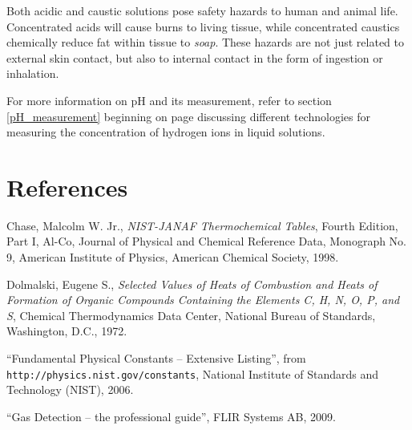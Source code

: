 \vskip 10pt

Both acidic and caustic solutions pose safety hazards to human and animal life.  Concentrated acids will cause burns to living tissue, while concentrated caustics chemically reduce fat within tissue to \textit{soap}.  These hazards are not just related to external skin contact, but also to internal contact in the form of ingestion or inhalation.

\vskip 10pt

For more information on pH and its measurement, refer to section \ref{pH_measurement} beginning on page \pageref{pH_measurement} discussing different technologies for measuring the concentration of hydrogen ions in liquid solutions.











\filbreak
\section*{References}


\noindent
Chase, Malcolm W. Jr., \textit{NIST-JANAF Thermochemical Tables}, Fourth Edition, Part I, Al-Co, Journal of Physical and Chemical Reference Data, Monograph No. 9, American Institute of Physics, American Chemical Society, 1998.

\vskip 10pt

\noindent
Dolmalski, Eugene S., \textit{Selected Values of Heats of Combustion and Heats of Formation of Organic Compounds Containing the Elements C, H, N, O, P, and S}, Chemical Thermodynamics Data Center, National Bureau of Standards, Washington, D.C., 1972.

\vskip 10pt

\noindent
``Fundamental Physical Constants -- Extensive Listing'', from \texttt{http://physics.nist.gov/constants}, National Institute of Standards and Technology (NIST), 2006.

\vskip 10pt

\noindent
``Gas Detection -- the professional guide'', FLIR Systems AB, 2009.

\vskip 10pt

